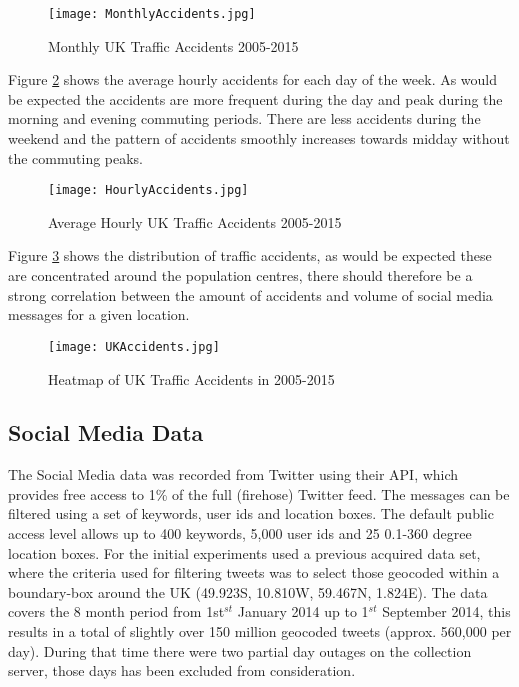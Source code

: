 \documentclass{article}
\begin{document}
\begin{figure}[h]
    \centering
    \texttt{[image: MonthlyAccidents.jpg]}
    \caption{Monthly UK Traffic Accidents 2005-2015}
    \label{fig:MonthlyAccidents}
\end{figure}

Figure \ref{fig:HourlyAccidents} shows the average hourly accidents for each day of the week. As would be expected the accidents are more frequent during the day and peak during the morning and evening commuting periods. There are less accidents during the weekend and the pattern of accidents smoothly increases towards midday without the commuting peaks.

\begin{figure}[h]
    \centering
    \texttt{[image: HourlyAccidents.jpg]}
    \caption{Average Hourly UK Traffic Accidents 2005-2015}
    \label{fig:HourlyAccidents}
\end{figure}

Figure \ref{fig:UKAccidents} shows the distribution of traffic accidents, as would be expected these are concentrated around the population centres, there should therefore be a strong correlation between the amount of accidents and volume of social media messages for a given location.

\begin{figure}[h]
    \centering
    \texttt{[image: UKAccidents.jpg]}
    \caption{Heatmap of UK Traffic Accidents in 2005-2015}
    \label{fig:UKAccidents}
\end{figure}

\subsection{Social Media Data}

The Social Media data was recorded from Twitter using their API, which provides free access to 1\% of the full (firehose) Twitter feed. The messages can be filtered using a set of keywords, user ids and location boxes. The default public access level allows up to 400 keywords, 5,000 user ids and 25 0.1-360 degree location boxes. For the initial experiments used a previous acquired data set, where the criteria used for filtering tweets was to select those geocoded within a boundary-box around the UK (49.923{\degree}S, 10.810{\degree}W, 59.467{\degree}N, 1.824{\degree}E). The data covers the 8 month period from 1st$^{st}$ January 2014 up to 1$^{st}$ September 2014, this results in a total of slightly over 150 million geocoded tweets (approx. 560,000 per day). During that time there were two partial day outages on the collection server, those days has been excluded from consideration.
\end{document}
